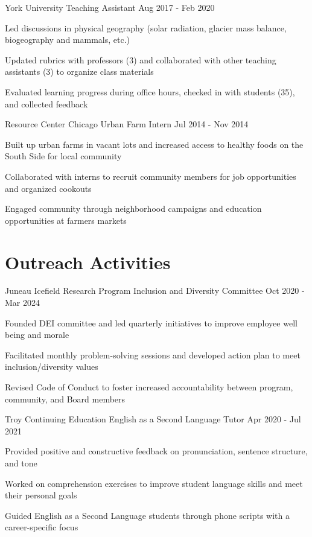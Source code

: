 \documentclass{../styles/resume}
\begin{document}
\subsectionpositiondate
    {York University}
    {Teaching Assistant}
    {Aug 2017 - Feb 2020}
\resumesublistbegin
    \item Led discussions in physical geography (solar radiation, glacier mass balance, biogeography and mammals, etc.)
    \item Updated rubrics with professors (3) and collaborated with other teaching assistants (3) to organize class materials
    \item Evaluated learning progress during office hours, checked in with students (35), and collected feedback
\resumesublistend

\subsectionpositiondate
    {Resource Center Chicago}
    {Urban Farm Intern}
    {Jul 2014 - Nov 2014}
\resumesublistbegin
    \item Built up urban farms in vacant lots and increased access to healthy foods on the South Side for local community
    \item Collaborated with interns to recruit community members for job opportunities and organized cookouts
    \item Engaged community through neighborhood campaigns and education opportunities at farmers markets
\resumesublistend

\section{Outreach Activities}

\subsectionpositiondate
    {Juneau Icefield Research Program}
    {Inclusion and Diversity Committee}
    {Oct 2020 - Mar 2024}
\resumesublistbegin
    \item Founded DEI committee and led quarterly initiatives to improve employee well being and morale
    \item Facilitated monthly problem-solving sessions and developed action plan to meet inclusion/diversity values
    \item Revised Code of Conduct to foster increased accountability between program, community, and Board members
\resumesublistend

\subsectionpositiondate
    {Troy Continuing Education}
    {English as a Second Language Tutor}
    {Apr 2020 - Jul 2021}
\resumesublistbegin
    \item Provided positive and constructive feedback on pronunciation, sentence structure, and tone
    \item Worked on comprehension exercises to improve student language skills and meet their personal goals
    \item Guided English as a Second Language students through phone scripts with a career-specific focus
\resumesublistend
\end{document}
